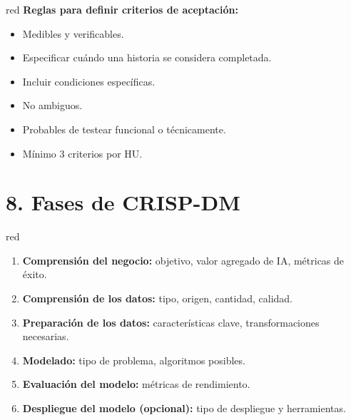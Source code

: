 \documentclass[
11pt, %
]{charter}
\begin{document}
\begin{consigna}{red}
\textbf{Reglas para definir criterios de aceptación:}
\begin{itemize}
  \item Medibles y verificables.
  \item Especificar cuándo una historia se considera completada.
  \item Incluir condiciones específicas.
  \item No ambiguos.
  \item Probables de testear funcional o técnicamente.
  \item Mínimo 3 criterios por HU.
\end{itemize}

\end{consigna} %


\section{8. Fases de CRISP-DM}

\begin{consigna}{red} %

\begin{enumerate}
  \item \textbf{Comprensión del negocio:} objetivo, valor agregado de IA, métricas de éxito.
  \item \textbf{Comprensión de los datos:} tipo, origen, cantidad, calidad.
  \item \textbf{Preparación de los datos:} características clave, transformaciones necesarias.
  \item \textbf{Modelado:} tipo de problema, algoritmos posibles.
  \item \textbf{Evaluación del modelo:} métricas de rendimiento.
  \item \textbf{Despliegue del modelo (opcional):} tipo de despliegue y herramientas.
\end{enumerate}

\end{consigna} %
\end{document}
